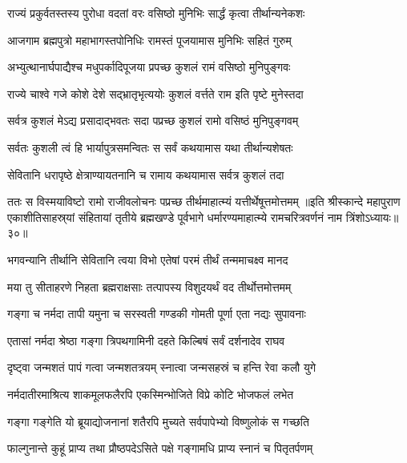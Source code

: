 \twolineshloka
{राज्यं प्रकुर्वतस्तस्य पुरोधा वदतां वरः}
{वसिष्ठो मुनिभिः सार्द्धं कृत्वा तीर्थान्यनेकशः}%

\twolineshloka
{आजगाम ब्रह्मपुत्रो महाभागस्तपोनिधिः}
{रामस्तं पूजयामास मुनिभिः सहितं गुरुम्}%

\twolineshloka
{अभ्युत्थानार्घपाद्यैश्च मधुपर्कादिपूजया}
{प्रपच्छ कुशलं रामं वसिष्ठो मुनिपुङ्गवः}%

\twolineshloka
{राज्ये चाश्वे गजे कोशे देशे सद्भ्रातृभृत्ययोः}
{कुशलं वर्त्तते राम इति पृष्टे मुनेस्तदा}%


\twolineshloka
{सर्वत्र कुशलं मेऽद्य प्रसादाद्भवतः सदा}
{पप्रच्छ कुशलं रामो वसिष्ठं मुनिपुङ्गवम्}%

\twolineshloka
{सर्वतः कुशली त्वं हि भार्यापुत्रसमन्वितः}
{स सर्वं कथयामास यथा तीर्थान्यशेषतः}%

\twolineshloka
{सेवितानि धरापृष्ठे क्षेत्राण्यायतनानि च}
{रामाय कथयामास सर्वत्र कुशलं तदा}%

\twolineshloka
{ततः स विस्मयाविष्टो रामो राजीवलोचनः}
{पप्रच्छ तीर्थमाहात्म्यं यत्तीर्थेषूत्तमोत्तमम्}%
॥इति श्रीस्कान्दे महापुराण एकाशीतिसाहस्र्यां संहितायां तृतीये ब्रह्मखण्डे पूर्वभागे धर्मारण्यमाहात्म्ये रामचरित्रवर्णनं नाम त्रिंशोऽध्यायः॥३०॥


\twolineshloka
{भगवन्यानि तीर्थानि सेवितानि त्वया विभो}
{एतेषां परमं तीर्थं तन्ममाचक्ष्व मानद}%

\twolineshloka
{मया तु सीताहरणे निहता ब्रह्मराक्षसाः}
{तत्पापस्य विशुदयर्थं वद तीर्थोत्तमोत्तमम्}%


\twolineshloka
{गङ्गा च नर्मदा तापी यमुना च सरस्वती}
{गण्डकी गोमती पूर्णा एता नद्यः सुपावनाः}%

\twolineshloka
{एतासां नर्मदा श्रेष्ठा गङ्गा त्रिपथगामिनी}
{दहते किल्बिषं सर्वं दर्शनादेव राघव}%

\twolineshloka
{दृष्ट्वा जन्मशतं पापं गत्वा जन्मशतत्रयम्}
{स्नात्वा जन्मसहस्रं च हन्ति रेवा कलौ युगे}%

\twolineshloka
{नर्मदातीरमाश्रित्य शाकमूलफलैरपि}
{एकस्मिन्भोजिते विप्रे कोटि भोजफलं लभेत}%

\twolineshloka
{गङ्गा गङ्गेति यो ब्रूयाद्योजनानां शतैरपि}
{मुच्यते सर्वपापेभ्यो विष्णुलोकं स गच्छति}%

\twolineshloka
{फाल्गुनान्ते कुहूं प्राप्य तथा प्रौष्ठपदेऽसिते}
{पक्षे गङ्गामधि प्राप्य स्नानं च पितृतर्पणम्}%

